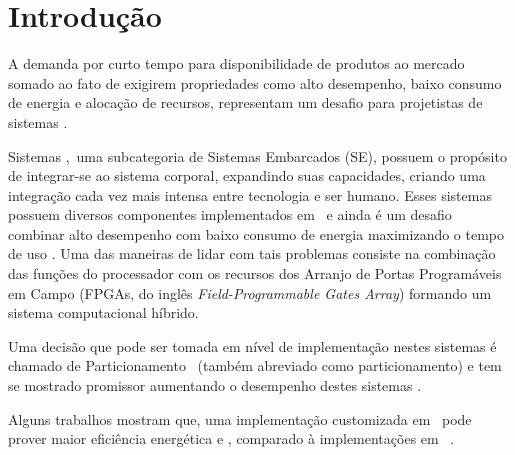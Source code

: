 \section{Introdução} \label{chap:introducao}
      
    
    A demanda por curto tempo para disponibilidade de produtos ao mercado somado ao fato de exigirem propriedades como alto desempenho, baixo consumo de energia e alocação de recursos, representam um desafio para projetistas de sistemas \wearables.
    
    Sistemas \Wearables,\ uma subcategoria de Sistemas Embarcados (SE), possuem o propósito de integrar-se ao sistema corporal, expandindo suas capacidades, criando uma integração cada vez mais intensa entre tecnologia e ser humano.
    Esses sistemas possuem diversos componentes implementados em \hs\ e ainda é um desafio combinar alto desempenho com baixo consumo de energia maximizando o tempo de uso \cite{Wolf1994, Edwards1994}.
    Uma das maneiras de lidar com tais problemas consiste na combinação das funções do processador com os recursos dos Arranjo de Portas Programáveis em Campo (FPGAs, do inglês \textit{Field-Programmable Gates Array}) formando um sistema computacional híbrido.
    
    
    Uma decisão que pode ser tomada em nível de implementação nestes sistemas é chamado de Particionamento \HS\ (também abreviado como particionamento) e tem se mostrado promissor aumentando o desempenho destes sistemas \cite{Sass2010, BenHajHassine2017}.
    
    
    Alguns trabalhos mostram que, uma implementação customizada em \hardware\ pode prover maior eficiência energética e \speedup, comparado à implementações em \software\ \cite{Zhang2008, BenHajHassine2017, Wolf1994, Canis2011, Stone2010}.
    
